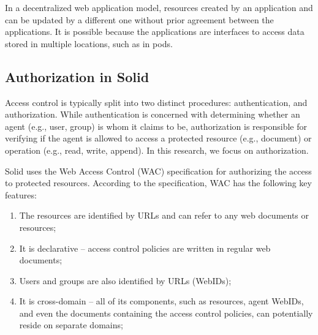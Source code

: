 \documentclass[sigconf]{acmart}
\begin{document}
In a decentralized web application model, resources created by an application and can be updated by a different one without prior agreement between the applications. It is possible because the applications are interfaces to access data stored in multiple locations, such as in pods.

\subsection{Authorization in Solid}

Access control is typically split into two distinct procedures: authentication, and authorization. While authentication is concerned with determining whether an agent (e.g., user, group) is whom it claims to be, authorization is responsible for verifying if the agent is allowed to access a protected resource (e.g., document) or operation (e.g., read, write, append). In this research, we focus on authorization.

Solid uses the Web Access Control (WAC) specification for authorizing the access to protected resources. According to the specification, WAC has the following key features:

\begin{enumerate}
\item The resources are identified by URLs and can refer to any web documents or resources;
\item It is declarative -- access control policies are written in regular web documents;
\item Users and groups are also identified by URLs (WebIDs);
\item It is cross-domain -- all of its components, such as resources, agent WebIDs, and even the documents containing the access control policies, can potentially reside on separate domains;
\end{enumerate}
\end{document}
